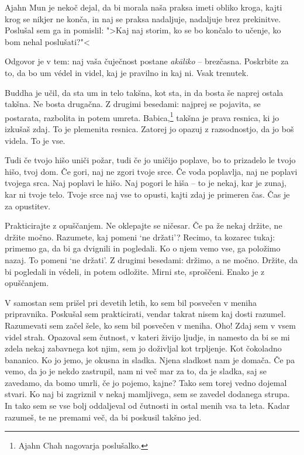 Ajahn Mun je nekoč dejal, da bi morala naša praksa imeti obliko kroga, kajti krog se nikjer ne konča, in naj se praksa nadaljuje, nadaljuje brez prekinitve. Poslušal sem ga in pomislil: ">Kaj naj storim, ko se bo končalo to učenje, ko bom nehal poslušati?"<

Odgovor je v tem: naj vaša čuječnost postane \emph{akāliko} – brezčasna. Poskrbite za to, da bo um védel in videl, kaj je pravilno in kaj ni. Vsak trenutek.

\clearpage


Buddha je učil, da sta um in telo takšna, kot sta, in da bosta še naprej ostala takšna. Ne bosta drugačna. Z drugimi besedami: najprej se pojavita, se postarata, razbolita in potem umreta. Babica,\footnote{Ajahn Chah nagovarja poslušalko.} takšna je prava resnica, ki jo izkušaš zdaj. To je plemenita resnica. Zatorej jo opazuj z razsodnostjo, da jo boš videla. To je vse.

Tudi če tvojo hišo uniči požar, tudi če jo uničijo poplave, bo to prizadelo le tvojo hišo, tvoj dom. Če gori, naj ne zgori tvoje srce. Če voda poplavlja, naj ne poplavi tvojega srca. Naj poplavi le hišo. Naj pogori le hiša – to je nekaj, kar je zunaj, kar ni tvoje telo. Tvoje srce naj vse to opusti, kajti zdaj je primeren čas. Čas je za opustitev.


Prakticirajte z opuščanjem. Ne oklepajte se ničesar. Če pa že nekaj držite, ne držite močno. Razumete, kaj pomeni `ne držati'? Recimo, ta kozarec tukaj: primemo ga, da bi ga dvignili in pogledali. Ko o njem vemo vse, ga položimo nazaj. To pomeni `ne držati'. Z drugimi besedami: držimo, a ne močno. Držite, da bi pogledali in védeli, in potem odložite. Mirni ste, sproščeni. Enako je z opuščanjem.

\clearpage


V samostan sem prišel pri devetih letih, ko sem bil posvečen v meniha pripravnika. Poskušal sem prakticirati, vendar takrat nisem kaj dosti razumel. Razumevati sem začel šele, ko sem bil posvečen v meniha. Oho! Zdaj sem v vsem videl strah. Opazoval sem čutnost, v kateri živijo ljudje, in namesto da bi se mi zdela nekaj zabavnega kot njim, sem jo doživljal kot trpljenje. Kot čokoladno bananico. Ko jo jemo, je okusna in sladka. Njena sladkost nam je domača. Če pa vemo, da jo je nekdo zastrupil, nam ni več mar za to, da je sladka, saj se zavedamo, da bomo umrli, če jo pojemo, kajne? Tako sem torej vedno dojemal stvari. Ko naj bi zagriznil v nekaj mamljivega, sem se zavedel dodanega strupa. In tako sem se vse bolj oddaljeval od čutnosti in ostal menih vsa ta leta. Kadar razumeš, te ne premami več, da bi poskusil takšno jed.

